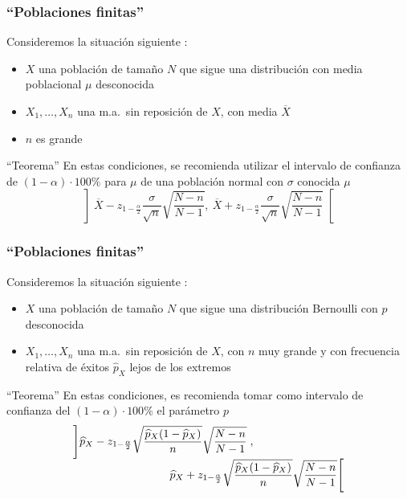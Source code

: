 \documentclass[12pt,t]{beamer}\usepackage[]{graphicx}\usepackage[]{color}
\theoremstyle{plain}
\theoremstyle{definition}
\begin{document}
\begin{frame}
\frametitle{``Poblaciones finitas''}

Consideremos  la situación siguiente  :
\begin{itemize}
\item  $X$ una población de  tamaño  $N$ que sigue una distribución con media   poblacional $\mu$ desconocida

\item $X_1,\ldots,X_n$ una m.a.\ sin reposición de $X$, con media   $\overline{X}$

\item  $n$ es grande 
\end{itemize}

\begin{block}{``Teorema''}
En estas  condiciones, se recomienda utilizar el intervalo de confianza de $(1-\alpha)\cdot 100\%$  para $\mu$ de una población normal con $\sigma$ conocida
$\mu$
$$
\left]\overline{X}-z_{1-\frac{\alpha}{2}}\frac{\sigma}{\sqrt{n}}\sqrt{\frac{N-n}{N-1}},\
    \overline{X}+z_{1-\frac{\alpha}{2}}\frac{\sigma}{\sqrt{n}}\sqrt{\frac{N-n}{N-1}}\right[
$$
\end{block}



\end{frame}




\begin{frame}
\frametitle{``Poblaciones finitas''}
\vspace*{-2ex}

Consideremos  la situación siguiente  :
\begin{itemize}
\item  $X$ una población de  tamaño  $N$ que sigue una distribución Bernoulli con $p$ desconocida

\item $X_1,\ldots,X_n$ una m.a.\ sin reposición de $X$, con $n$ muy grande  y con frecuencia relativa de éxitos $\widehat{p}_{X}$ lejos de los  extremos
\end{itemize}
\medskip

\begin{block}{``Teorema''}
En estas  condiciones, es recomienda tomar como  intervalo  de confianza  del $(1-\alpha)\cdot 100\%$ el parámetro $p$
$$
\begin{array}{l}
\displaystyle \left]\widehat{p}_{X}-z_{1-\frac{\alpha}{2}}\sqrt{\frac{\widehat{p}_{X}
(1-\widehat{p}_{X})}{n}}\sqrt{\frac{N-n}{N-1}}\right.,\\[1ex]
\hspace*{3cm}\displaystyle
\left.\widehat{p}_{X}+z_{1-\frac{\alpha}{2}}\sqrt{\frac{\widehat{p}_{X}
(1-\widehat{p}_{X})}{n}}\sqrt{\frac{N-n}{N-1}}\right[
\end{array}$$
\end{block}
\end{frame}
\end{document}

